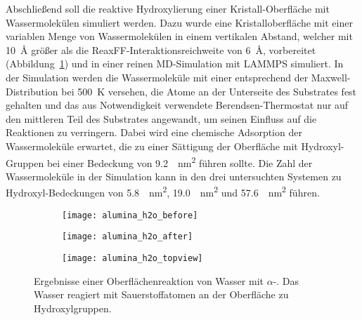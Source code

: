 Abschließend soll die reaktive Hydroxylierung einer Kristall-Oberfläche mit Wassermolekülen simuliert werden.
Dazu wurde eine Kristalloberfläche mit einer variablen Menge von Wassermolekülen in einem vertikalen Abstand, welcher mit \SI{10}{\angstrom} größer als die ReaxFF-Inter\-aktions\-reich\-weite von \SI{6}{\angstrom}, vorbereitet (Abbildung~\ref{fig:wateraluminasurface-a}) und in einer reinen MD-Simulation mit LAMMPS simuliert.
In der Simulation werden die Wassermoleküle mit einer entsprechend der Maxwell-Distribution bei \SI{500}{\kelvin} versehen, die Atome an der Unterseite des Substrates fest gehalten und das aus Notwendigkeit verwendete Berendsen-Thermostat nur auf den mittleren Teil des Substrates angewandt, um seinen Einfluss auf die Reaktionen zu verringern.
Dabei wird eine chemische Adsorption der Wassermoleküle erwartet\cite{shapovalov_ab_2000}, die zu einer Sättigung der Oberfläche mit Hydroxyl-Gruppen bei einer Bedeckung von \SI{9.2}{\per\square\nano\meter}\cite{kim_energy_2011} führen sollte.
Die Zahl der Wassermoleküle in der Simulation kann in den drei untersuchten Systemen zu Hydroxyl-Bedeckungen von \SI{5.8}{\per\square\nano\meter}, \SI{19.0}{\per\square\nano\meter} und \SI{57.6}{\per\square\nano\meter} führen.
\begin{figure}
  \captionsetup[subfigure]{singlelinecheck=false}
  \def\subfigwidth{0.32\textwidth}
  \begin{subfigure}[t]{\subfigwidth}
    \texttt{[image: alumina\_h2o\_before]}
    \label{fig:wateraluminasurface-a}
  \end{subfigure}
  \hfill
  \begin{subfigure}[t]{\subfigwidth}
    \texttt{[image: alumina\_h2o\_after]}
    \label{fig:wateraluminasurface-b}
  \end{subfigure}
  \hfill
  \begin{subfigure}[t]{\subfigwidth}
    \texttt{[image: alumina\_h2o\_topview]}
    \label{fig:wateraluminasurface-c}
  \end{subfigure}
  \caption[Oberflächenreaktion von Wasser mit $\alpha$-]{Ergebnisse einer Oberflächenreaktion von Wasser mit $\alpha$-.
    Das Wasser reagiert mit Sauerstoffatomen an der Oberfläche zu Hydroxylgruppen.
  }
  \label{fig:wateraluminasurface}
\end{figure}

